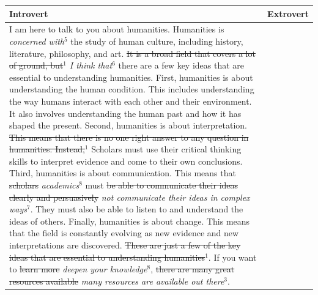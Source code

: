 \documentclass[nomenclature, english, biblatex]{kththesis}
\begin{document}
\begin{table}
    \centering
    \begin{adjustbox}{max width=\textwidth}
        \begin{tabular}{|p{}|p{}|}
        \hline
        Introvert & Extrovert \\
        \hline
        \hline
        I am here to talk to you about humanities. Humanities is \textit{concerned with}$^5$ the study of human culture, including history, literature, philosophy, and art. \sout{It is a broad field that covers a lot of ground, but}$^1$ \textit{I think that}$^6$ there are a few key ideas that are essential to understanding humanities. First, humanities is about understanding the human condition. This includes understanding the way humans interact with each other and their environment. It also involves understanding the human past and how it has shaped the present. Second, humanities is about interpretation. \sout{This means that there is no one right answer to any question in humanities. Instead,}$^1$ Scholars must use their critical thinking skills to interpret evidence and come to their own conclusions. Third, humanities is about communication. This means that \sout{scholars} \textit{academics}$^8$ must \sout{be able to communicate their ideas clearly and persuasively} \textit{not communicate their ideas in complex ways}$^7$. They must also be able to listen to and understand the ideas of others. Finally, humanities is about change. This means that the field is constantly evolving as new evidence and new interpretations are discovered. \sout{These are just a few of the key ideas that are essential to understanding humanities}$^1$. If you want to \sout{learn more} \textit{deepen your knowledge}$^8$, \sout{there are many great resources available} \textit{many resources are available out there}$^3$.
        &

\end{tabular}
\end{adjustbox}
\end{table}
\end{document}
